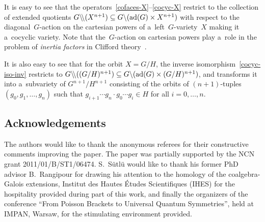 \documentclass[pdftex]{sigma}
\numberwithin{equation}{section}
\DeclareMathOperator{\ad}{ad}
\begin{document}
It is easy to see that the operators~\eqref{cofaces-X}--\eqref{cocyc-X}
restrict to the collection
of extended quotients $G\backslash\hspace{-0.23em}\backslash (X^{n+1})\subseteq G\backslash (\ad(G)\times X^{n+1})$
with respect to the diagonal~$G$-action on the cartesian powers of a~left~$G$-variety~$X$ making it a~cocyclic variety.
Note that the~$G$-action on cartesian powers play a~role in the problem of \emph{inertia factors} in Clif\/ford
theory~\cite{PahlPles87}.

It is also easy to see that for the orbit $X=G/H$, the inverse isomorphism~\eqref{cocyc-iso-inv} restricts to
$G\backslash\hspace{-0.23em}\backslash ((G/H)^{n+1})\subseteq G\backslash (\ad(G)\times (G/H)^{n+1})$, and
transforms it into a~subvariety of $G^{n+1}/H^{n+1}$ consisting of the orbits of $(n+1)$-tuples $(g_{0}, g_{1},\ldots,
g_{n})$ such that $g_{i+1}\cdots g_{n}\cdot g_{0}\cdots g_{i}\in H$ for all $i=0,\ldots, n$.

\subsection*{Acknowledgements}
The authors would like to thank the anonymous referees for their constructive comments impro\-ving the paper.
The paper was partially supported by the NCN grant 2011/01/B/ST1/06474.
S.~S\"utl\"u would like to thank his former PhD advisor B.~Rangipour for drawing his attention to the homology of the
coalgebra-Galois extensions, Institut des Hautes \'Etudes Scientif\/iques (IHES) for the hospitality provided during part
of this work, and f\/inally the organizers of the conference ``From Poisson Brackets to Universal Quantum Symmetries'',
held at IMPAN, Warsaw, for the stimulating environment provided.
\end{document}
